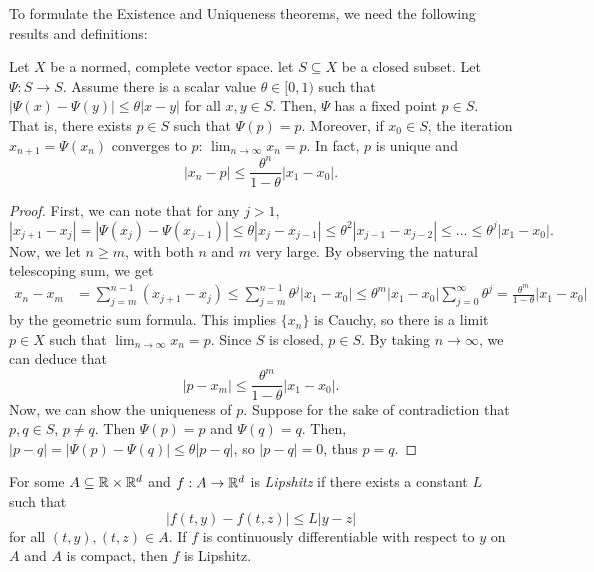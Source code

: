 \documentclass{article}
\begin{document}
\newpar
To formulate the Existence and Uniqueness theorems, we need the following results and definitions:


\begin{theorem}{}
    Let $X$ be a normed, complete vector space. let $S \subseteq X$ be a closed subset. Let $\Psi : S \to S$. Assume there is a scalar value $\theta \in [0, 1)$ such that $|\Psi(x) - \Psi(y)| \leq \theta|x - y|$ for all $x, y \in S$. Then, $\Psi$ has a fixed point $p \in S$. That is, there exists $p \in S$ such that $\Psi(p) = p$. Moreover, if $x_0 \in S$, the iteration $x_{n + 1} = \Psi(x_n)$ converges to $p$: $\displaystyle\lim_{n \to \infty} x_n = p$. In fact, $p$ is unique and 
        \[
            |x_n - p| \leq \frac{\theta^n}{1 - \theta}|x_1 - x_0|.
        \]
\end{theorem}
\begin{proof}
    First, we can note that for any $j > 1$,
        \[|x_{j + 1} - x_j| = |\Psi(x_j) - \Psi(x_{j - 1}) | \leq \theta |x_j - x_{j - 1}| \leq \theta^2 |x_{j - 1} - x_{j - 2}| \leq \hdots \leq \theta^j|x_1 - x_0|.\]
    Now, we let $n \geq m$, with both $n$ and $m$ very large. By observing the natural telescoping sum, we get 
    \begin{align*}
        x_n - x_m &= \sum_{j = m}^{n - 1} (x_{j + 1} - x_j) \leq \sum_{j = m}^{n - 1} \theta^j|x_1 - x_0| \leq \theta^m |x_1 - x_0| \sum_{j =0}^\infty \theta^j = \frac{\theta^m}{1 - \theta} | x_1 - x_0|
    \end{align*}
    by the geometric sum formula. This implies $\{x_n\}$ is Cauchy, so there is a limit $p \in X$ such that $\displaystyle\lim_{n \to \infty} x_n = p$. Since $S$ is closed, $p \in S$. By taking $n \to \infty$, we can deduce that 
        \[
            |p - x_m| \leq \frac{\theta^m}{1 - \theta}|x_1 - x_0|.
        \]
    Now, we can show the uniqueness of $p$. Suppose for the sake of contradiction that $p, q \in S$, $p \neq q$. Then $\Psi(p) = p$ and $\Psi(q) = q$. Then, $|p - q| = |\Psi(p) - \Psi(q)| \leq \theta | p - q|$, so $|p - q| = 0$, thus $p = q$. 
\end{proof}

\begin{definition}
    For some $A \subseteq \mathbb{R} \times \mathbb{R}^d$ and $f : A \to \mathbb{R}^d$ is \textit{Lipshitz} if there exists a constant $L$ such that 
        \[
            |f(t, y) - f(t,z)| \leq L|y - z|
        \]
    for all $(t, y), (t, z) \in A$. If $f$ is continuously differentiable with respect to $y$ on $A$ and $A$ is compact, then $f$ is Lipshitz.
\end{definition}
\end{document}
